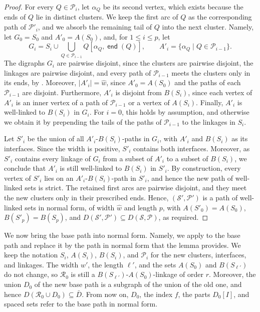 \documentclass[fontsize=12pt,leading=14pt]{fullpaper}
\DeclareMathOperator{\en}{\mathsf{end}}
\newcommand{\Pcal}{\mathcal{P}}
\newcommand{\Rcal}{\mathcal{R}}
\newcommand{\Scal}{\mathcal{S}}
\begin{document}
\begin{proof}
  For every $Q\in\Pcal_i$, let $\alpha_Q$ be its second vertex, which exists because the ends of $Q$ lie in distinct clusters.
  We keep the first arc of $Q$ as the corresponding path of $\Pcal'_i$, and we absorb the remaining tail of $Q$ into the next cluster.
  Namely, let $G_0=S_0$ and $A'_0=A(S_0)$, and, for $1\le i\le p$, let
  \[
    G_i=S_i\cup\bigcup_{Q\in\Pcal_{i-1}}Q[\alpha_Q,\en(Q)],\qquad
    A'_i=\{\alpha_Q\mid Q\in\Pcal_{i-1}\}.
  \]
  The digraphs $G_i$ are pairwise disjoint, since the clusters are pairwise disjoint, the linkages are pairwise disjoint, and every path of $\Pcal_{i-1}$ meets the clusters only in its ends, by .
  Moreover, $|A'_i|=\hat w$, since $A'_0=A(S_0)$ and the paths of each $\Pcal_{i-1}$ are disjoint.
  Furthermore, $A'_i$ is disjoint from $B(S_i)$, since each vertex of $A'_i$ is an inner vertex of a path of $\Pcal_{i-1}$ or a vertex of $A(S_i)$.
  Finally, $A'_i$ is well-linked to $B(S_i)$ in $G_i$.
  For $i=0$, this holds by assumption, and otherwise we obtain it by prepending the tails of the paths of $\Pcal_{i-1}$ to the linkages in $S_i$.

  Let $S'_i$ be the union of all $A'_i$-$B(S_i)$-paths in $G_i$, with $A'_i$ and $B(S_i)$ as its interfaces.
  Since the width is positive, $S'_i$ contains both interfaces.
  Moreover, as $S'_i$ contains every linkage of $G_i$ from a subset of $A'_i$ to a subset of $B(S_i)$, we conclude that $A'_i$ is still well-linked to $B(S_i)$ in $S'_i$.
  By construction, every vertex of $S'_i$ lies on an $A'_i$-$B(S_i)$-path in $S'_i$, and hence the new path of well-linked sets is strict.
  The retained first arcs are pairwise disjoint, and they meet the new clusters only in their prescribed ends.
  Hence, $(\Scal',\Pcal')$ is a path of well-linked sets in normal form, of width $\hat w$ and length $p$, with $A(S'_0)=A(S_0)$, $B(S'_p)=B(S_p)$, and $D(\Scal',\Pcal')\subseteq D(\Scal,\Pcal)$, as required.
\end{proof}

We now bring the base path into normal form.
Namely, we apply  to the base path and replace it by the path in normal form that the lemma provides.
We keep the notation $S_i$, $A(S_i)$, $B(S_i)$, and $\Pcal_i$ for the new clusters, interfaces, and linkages.
The width $w'$, the length $\ell'$, and the sets $A(S_0)$ and $B(S_{\ell'})$ do not change, so $\Rcal_0$ is still a $B(S_{\ell'})$-$A(S_0)$-linkage of order $r$.
Moreover, the union $D_0$ of the new base path is a subgraph of the union of the old one, and hence $D(\Rcal_0\cup D_0)\subseteq\bar D$.
From now on, $D_0$, the index $f$, the parts $D_0[I]$, and spaced sets refer to the base path in normal form.
\end{document}
